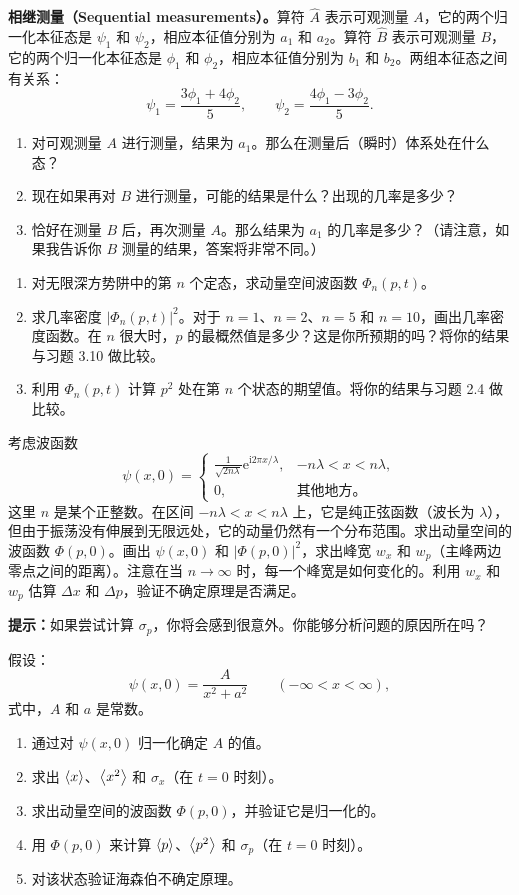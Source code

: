 \textbf{相继测量（Sequential measurements）。}算符 $\hat A$ 表示可观测量 $A$，它的两个归一化本征态是 $\psi_1$ 和 $\psi_2$，相应本征值分别为 $a_1$ 和 $a_2$。算符 $\hat B$ 表示可观测量 $B$，它的两个归一化本征态是 $\phi_1$ 和 $\phi_2$，相应本征值分别为 $b_1$ 和 $b_2$。两组本征态之间有关系：
\[
\psi_1=\frac{3\phi_1+4\phi_2}{5},\qquad
\psi_2=\frac{4\phi_1-3\phi_2}{5}.
\]
\begin{enumerate}
\item 对可观测量 $A$ 进行测量，结果为 $a_1$。那么在测量后（瞬时）体系处在什么态？
\item 现在如果再对 $B$ 进行测量，可能的结果是什么？出现的几率是多少？
\item 恰好在测量 $B$ 后，再次测量 $A$。那么结果为 $a_1$ 的几率是多少？（请注意，如果我告诉你 $B$ 测量的结果，答案将非常不同。）
\end{enumerate}
\vfill

\begin{enumerate}
\item 对无限深方势阱中的第 $n$ 个定态，求动量空间波函数 $\Phi_n(p,t)$。
\item 求几率密度 $|\Phi_n(p,t)|^2$。对于 $n=1$、$n=2$、$n=5$ 和 $n=10$，画出几率密度函数。在 $n$ 很大时，$p$ 的最概然值是多少？这是你所预期的吗？将你的结果与习题 3.10 做比较。
\item 利用 $\Phi_n(p,t)$ 计算 $p^2$ 处在第 $n$ 个状态的期望值。将你的结果与习题 2.4 做比较。
\end{enumerate}
\vfill

考虑波函数
\[
\psi(x,0)=\begin{cases}
\displaystyle\frac{1}{\sqrt{2n\lambda}}\mathrm{e}^{\mathrm{i}2\pi x/\lambda},&-n\lambda<x<n\lambda,\\[6pt]
0,&\text{其他地方。}
\end{cases}
\]
这里 $n$ 是某个正整数。在区间 $-n\lambda<x<n\lambda$ 上，它是纯正弦函数（波长为 $\lambda$），但由于振荡没有伸展到无限远处，它的动量仍然有一个分布范围。求出动量空间的波函数 $\Phi(p,0)$。画出 $\psi(x,0)$ 和 $|\Phi(p,0)|^2$，求出峰宽 $w_x$ 和 $w_p$（主峰两边零点之间的距离）。注意在当 $n\to\infty$ 时，每一个峰宽是如何变化的。利用 $w_x$ 和 $w_p$ 估算 $\Delta x$ 和 $\Delta p$，验证不确定原理是否满足。

\textbf{提示：}如果尝试计算 $\sigma_p$，你将会感到很意外。你能够分析问题的原因所在吗？
\vfill

假设：
\[
\psi(x,0)=\frac{A}{x^2+a^2}\qquad(-\infty<x<\infty),
\]
式中，$A$ 和 $a$ 是常数。
\begin{enumerate}
\item 通过对 $\psi(x,0)$ 归一化确定 $A$ 的值。
\item 求出 $\left\langle x\right\rangle$、$\left\langle x^2\right\rangle$ 和 $\sigma_x$（在 $t=0$ 时刻）。
\item 求出动量空间的波函数 $\Phi(p,0)$，并验证它是归一化的。
\item 用 $\Phi(p,0)$ 来计算 $\left\langle p\right\rangle$、$\left\langle p^2\right\rangle$ 和 $\sigma_p$（在 $t=0$ 时刻）。
\item 对该状态验证海森伯不确定原理。
\end{enumerate}
\vfill

